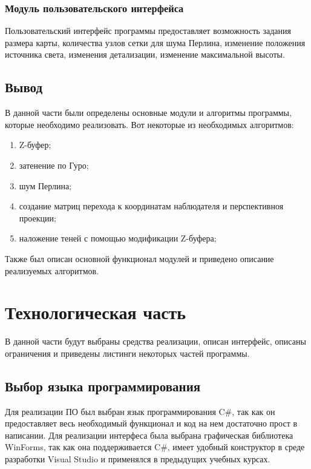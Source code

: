 \documentclass{article}
\begin{document}
	\subsubsection{Модуль пользовательского интерфейса}
	\indent  Пользовательский интерфейс программы предоставляет возможность задания размера карты, количества узлов сетки для шума Перлина, изменение положения источника света, изменения детализации, изменение максимальной высоты.
	\subsection{Вывод}
	\indent В данной части были определены основные модули и алгоритмы программы, которые необходимо реализовать. Вот некоторые из необходимых алгоритмов:
	\begin{enumerate}
		\item Z-буфер;
		\item затенение по Гуро;
		\item шум Перлина;
		\item создание матриц перехода к координатам наблюдателя и перспективноя проекции;
		\item наложение теней с помощью модификации Z-буфера;
	\end{enumerate}
	Также был описан основной функционал модулей и приведено описание реализуемых алгоритмов.
	\newpage
	\section{Технологическая часть}
	\indent В данной части будут выбраны средства реализации, описан интерфейс, описаны ограничения и приведены листинги некоторых частей программы.
	\subsection{Выбор языка программирования}
	\indent Для реализации ПО был выбран язык программирования C\#, так как он предоставляет весь необходимый функционал и код на нем достаточно прост в написании. Для реализации интерфеса была выбрана графическая библиотека WinForms, так как она поддерживается C\#, имеет удобный конструктор в среде разработки Visual Studio и применялся в предыдущих учебных курсах.
\end{document}
